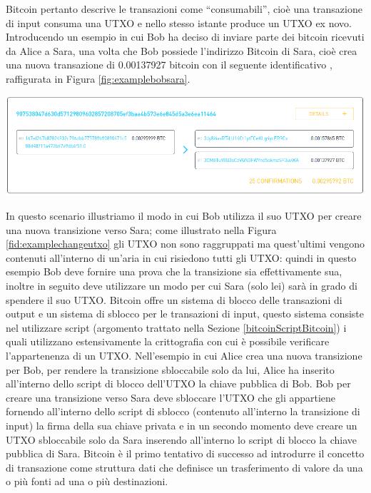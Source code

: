Bitcoin pertanto descrive le transazioni come “consumabili”, cioè una transazione di input consuma una UTXO e nello stesso istante produce un UTXO ex novo.\newline
Introducendo un esempio in cui Bob ha deciso di inviare parte dei bitcoin ricevuti da Alice a Sara, una volta che Bob possiede l’indirizzo Bitcoin di Sara, cioè  crea una nuova transazione di 0.00137927 bitcoin con il seguente identificativo , raffigurata in Figura \ref{fig:examplebobsara}.

{\centering
\vspace{15pt}
\includegraphics[scale=0.35]{images/example_bob_sara.png}
\vspace{10pt}
\par}

In questo scenario illustriamo il modo in cui Bob utilizza il suo UTXO per creare una nuova transizione verso Sara; come illustrato nella Figura \ref{fid:examplechangeutxo} gli UTXO non sono raggruppati ma quest’ultimi vengono contenuti all’interno di un'aria in cui risiedono tutti gli UTXO: quindi in questo esempio Bob deve fornire una prova che la transizione sia effettivamente sua, inoltre in seguito deve utilizzare un modo per cui Sara (solo lei) sarà in grado di spendere il suo UTXO.\newline
Bitcoin offre un sistema di blocco delle transazioni di output e un sistema di sblocco per le transazioni di input, questo sistema consiste nel utilizzare script (argomento trattato nella Sezione \ref{bitcoinScriptBitcoin}) i quali utilizzano estensivamente la crittografia con cui è possibile verificare l'appartenenza di un UTXO.
Nell'esempio in cui Alice crea una nuova transizione per Bob, per rendere la transizione sbloccabile solo da lui, Alice ha inserito all’interno dello script di blocco dell’UTXO la chiave pubblica di Bob.
Bob per creare una transizione verso Sara deve sbloccare l’UTXO che gli appartiene fornendo all’interno dello script di sblocco (contenuto all’interno la transizione di input) la firma della sua chiave privata e in un secondo momento deve creare un UTXO sbloccabile solo da Sara inserendo all’interno lo script di blocco la chiave pubblica di Sara.
\newline
Bitcoin è il primo tentativo di successo ad introdurre il concetto di transazione come struttura dati che definisce un trasferimento di valore da una o più fonti ad una o più destinazioni.

